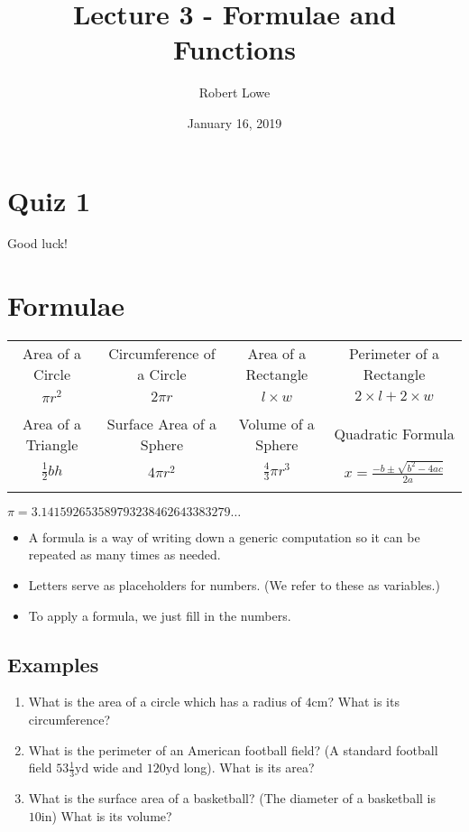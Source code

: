 \documentclass{article}
\title{Lecture 3 - Formulae and Functions}
\author{Robert Lowe}
\date{January 16, 2019}
\begin{document}
\maketitle

\section*{Quiz 1}
Good luck!

\section*{Formulae}
\begin{tabular}{|c|c|c|c|}
\hline
Area of a Circle & Circumference of a Circle & Area of a Rectangle & Perimeter of a Rectangle\\
$\pi r^2$ & $2\pi r$ & $l \times w$ & $2\times l + 2 \times w$\\
& & &\\
\hline
Area of a Triangle & Surface Area of a Sphere & Volume of a Sphere & Quadratic Formula\\
$\frac{1}{2}bh$ & $4 \pi r^2$ & $\frac{4}{3} \pi r ^3$ & $x = \displaystyle\frac{-b \pm \sqrt{b^2-4ac}}{2a}$\\
& & &\\
\hline
\end{tabular}\newline
$\pi=3.141592653589793238462643383279\ldots$

\begin{itemize}
\item A formula is a way of writing down a generic computation so it can be repeated 
 as many times as needed.
\item Letters serve as placeholders for numbers.  (We refer to these as variables.)
\item To apply a formula, we just fill in the numbers.
\end{itemize}

\subsection*{Examples}
\begin{enumerate}
\item What is the area of a circle which has a radius of $4\mathrm{cm}$? What is its circumference?
\item What is the perimeter of an American football field?  (A standard football field $53\frac{1}{3}\mathrm{yd}$ wide and $120 \mathrm{yd}$ long).  What is its area?
\item What is the surface area of a basketball? (The diameter of a basketball is $10\mathrm{in}$) What is its volume?
\end{enumerate}
\end{document}
